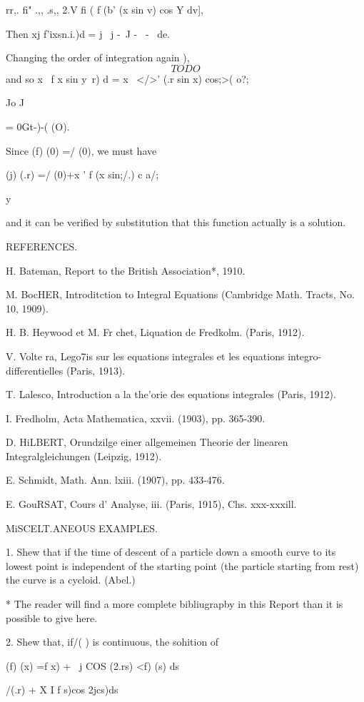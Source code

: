 {rr,. fi" .,, .s,, 2.V fi ( f (b' (x sin v) cos Y dv],

Then xj f'ixsn.i.)d = j \ j -~J -~ - \ de.

Changing the order of integration again ),
$$
TODO
$$
and so x \ f x sin y\ r) d = x \ </>' (.r sin x) cos;>( o?;

Jo J

= 0Gt-)-( (O).

Since (f) (0) =/ (0), we must have

(j) (.r) =/ (0)+x ' f (x sin;/.) c a/;

y

and it can be verified by substitution that this function actually is
a solution.

REFERENCES.

H. Bateman, Report to the British Association*, 1910.

M. BocHER, Introditction to Integral Equations (Cambridge Math.
Tracts, No. 10, 1909).

H. B. Heywood et M. Fr chet, Liquation de Fredkolm. (Paris, 1912).

V. Volte ra, Lego7is sur les equations integrales et les equations
integro-differentielles (Paris, 1913).

T. Lalesco, Introduction a la the'orie des equations integrales
(Paris, 1912).

I. Fredholm, Acta Mathematica, xxvii. (1903), pp. 365-390.

D. HiLBERT, Orundzilge einer allgemeinen Theorie der linearen
Integralgleichungen (Leipzig, 1912).

E. Schmidt, Math. Ann. lxiii. (1907), pp. 433-476.

E. GouRSAT, Cours d' Analyse, iii. (Paris, 1915), Chs. xxx-xxxill.

MiSCELT.ANEOUS EXAMPLES.

1. Shew that if the time of descent of a particle down a smooth curve
to its lowest point is independent of the starting point (the particle
starting from rest) the curve is a cycloid. (Abel.)

* The reader will find a more complete bibliugrapby in this Report
than it is possible to give here.

%
%

2. Shew that, if/( ) is continuous, the sohition of

(f) (x) =f x) + \ j COS (2.rs) <f) (s) ds

/(.r) + X I f s)cos 2jcs)ds

}
